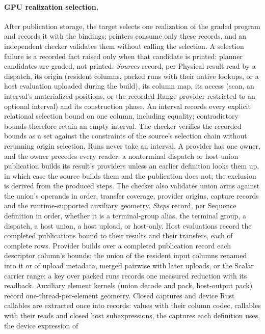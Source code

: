 \paragraph{GPU realization selection.}
After publication storage, the target selects one realization of the graded
program and records it with the bindings; printers consume only these
records, and an independent checker validates them without calling the
selection. A selection failure is a recorded fact raised only when that
candidate is printed: planner candidates are graded, not printed.
\emph{Sources} record, per Physical result read by a dispatch, its origin
(resident columns, packed runs with their native lookups, or a host
evaluation uploaded during the build), its column map, its access (scan, an
interval's materialized positions, or the recorded Range provider restricted
to an optional interval) and its construction phase. An interval records
every explicit relational selection bound on one column, including equality;
contradictory bounds therefore retain an empty interval. The checker verifies
the recorded bounds as a set against the constraints of the source's
selection chain without rerunning origin selection. Runs never take an
interval. A provider has one owner, and the owner precedes every reader: a
nonterminal dispatch or host-union publication builds its result's providers
unless an earlier definition looks them up, in which case the source builds
them and the publication does not; the exclusion is derived from the produced
steps.
The checker also validates union arms against the union's operands in order,
transfer coverage, provider origins, capture records and the runtime-supported
auxiliary geometry. \emph{Steps} record,
per Sequence definition in order, whether it is a terminal-group alias, the
terminal group, a dispatch, a host union, a host upload, or host-only.
Host evaluations record the completed publications bound to their results and
their transfers, each of complete rows. Provider builds over a completed
publication record each descriptor column's bounds: the union of the resident
input columns renamed into it or of upload metadata, merged pairwise with later
uploads, or the Scalar carrier range; a key over packed runs records one
measured reduction with its readback. Auxiliary element kernels (union decode
and pack, host-output pack) record one-thread-per-element geometry.
Closed captures and device Rust callables are extracted once into records:
values with their column codec, callables with their reads and closed host
subexpressions, the captures each definition uses, the device expression of
